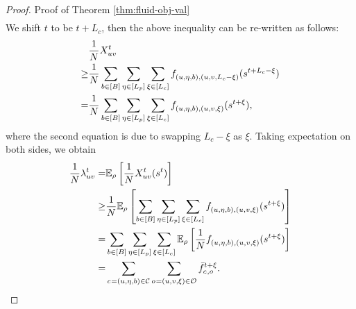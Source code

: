\begin{proof}{Proof of Theorem \ref{thm:fluid-obj-val}}
\begin{align*}
    \end{align*}
We shift $t$ to be $t+L_c$, then the above inequality can be re-written as follows: \begin{align*}
        &\frac{1}{\Size} \arrnum{\origin\destination}{\time} \\\geq& \frac{1}{\Size} \sum_{\battery \in [\range]} \sum_{\timetoarrival \in [\Lp]} \sum_{\tripactivetime \in [\Lc]} \jointtripfulfillaction{(\origin, \timetoarrival, \battery), (\origin, \destination, L_c- \tripactivetime)}{}(s^{\time + L_c - \tripactivetime})\\
        =&\frac{1}{\Size} \sum_{\battery \in [\range]} \sum_{\timetoarrival \in [\Lp]} \sum_{\tripactivetime \in [\Lc]} \jointtripfulfillaction{(\origin, \timetoarrival, \battery), (\origin, \destination, \tripactivetime)}{}(s^{\time + \tripactivetime}), 
    \end{align*}
    where the second equation is due to swapping $L_c - \xi$ as $\xi$. Taking expectation on both sides, we obtain
    \begin{align*}
        \frac{1}{\Size} \arrrate{\origin \destination}{\time} =& \mathbb{E}_{\rho}\left[\frac{1}{\Size} \arrnum{\origin\destination}{\time}(s^t) \right]\\
        \geq& \frac{1}{\Size} \mathbb{E}_{\rho}\left[\sum_{\battery \in [\range]} \sum_{\timetoarrival \in [\Lp]} \sum_{\tripactivetime \in [\Lc]} \jointtripfulfillaction{(\origin, \timetoarrival, \battery), (\origin, \destination, \tripactivetime)}{}(s^{\time + \tripactivetime}) \right]\\
        =& \sum_{\battery \in [\range]} \sum_{\timetoarrival \in [\Lp]} \sum_{\tripactivetime \in [\Lc]} \mathbb{E}_{\rho}\left[\frac{1}{\Size} \jointtripfulfillaction{(\origin, \timetoarrival, \battery), (\origin, \destination, \tripactivetime)}{}(s^{\time + \tripactivetime})\right]\\
        =& \sum_{\cartype{} = (\origin, \timetoarrival, \battery) \in \Cartype} \sum_{\triptype{} = (\origin, \destination, \tripactivetime) \in \Triptype} \lptripfulfill{\cartype{}, \triptype{}}{\time + \tripactivetime}.
    \end{align*}


\end{proof}
